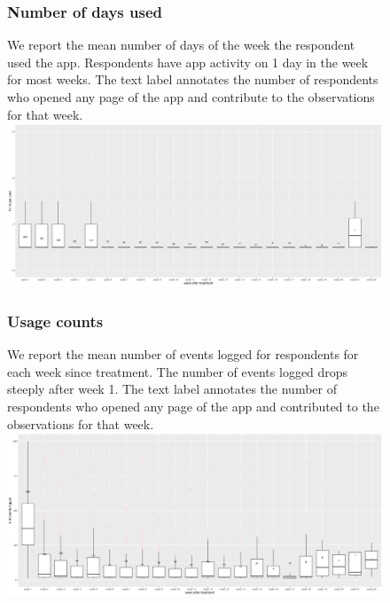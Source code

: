 \documentclass{article}
\begin{document}
\begin{figure}
\subsubsection*{Number of days used}
We report the mean number of days of the week the respondent used the app. Respondents have app activity on 1 day in the week for most weeks. The text label annotates the number of respondents who opened any page of the app and contribute to the observations for that week. 
\includegraphics[scale=0.35]{plots/app usage over time - days used.png}

\subsubsection*{Usage counts}
We report the mean number of events logged for respondents for each week since treatment. The number of events logged drops steeply after week 1. The text label annotates the number of respondents who opened any page of the app and contributed to the observations for that week.
\includegraphics[scale=0.35]{plots/app usage over time - usage count.png}
\end{figure}
\end{document}
